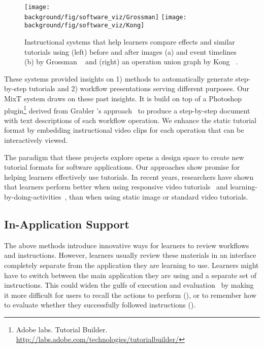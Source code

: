 \begin{figure*}[t!]
  \centering
  \texttt{[image: \\background/fig/software\_viz/Grossman]}
  \texttt{[image: \\background/fig/software\_viz/Kong]}
  \caption{Instructional systems that help learners compare effects and similar tutorials using (left) before and after images (a) and event timelines (b) by Grossman \ea{}~\cite{Grossman:2010jz} and (right) an operation union graph by Kong \ea{}~\cite{Kong:2012:DTR:2207676.2208549}.}
  \label{fig:related_comparison}
\end{figure*}

These systems provided insights on 1) methods to automatically generate step-by-step tutorials and 2) workflow presentations serving different purposes.
%
Our MixT system draws on these past insights. It is build on top of a Photoshop plugin\footnote{Adobe labs. Tutorial Builder. \url{http://labs.adobe.com/technologies/tutorialbuilder/}} derived from Grabler \ea{}'s approach~\cite{Grabler:2009jj} to produce a step-by-step document with text descriptions of each workflow operation. We enhance the static tutorial format by embedding instructional video clips for each operation that can be interactively viewed.

The paradigm that these projects explore opens a design space to create new tutorial formats for software applications. Our approaches show promise for helping learners effectively use tutorials. In recent years, researchers have shown that learners perform better when using responsive video tutorials~\cite{Nguyen:2015:MST:2702123.2702209} and learning-by-doing-activities~\cite{Kwon:2016:CEO:2858036.2858101}, than when using static image or standard video tutorials.


\subsection{In-Application Support}

The above methods introduce innovative ways for learners to review workflows and instructions. However, learners usually review these materials in an interface completely separate from the application they are learning to use. Learners might have to switch between the main application they are using and a separate set of instructions. This could widen the gulfs of execution and evaluation~\cite{Hutchins:1985:DMI:1453233.1453235} by making it more difficult for users to recall the actions to perform (), or to remember how to evaluate whether they successfully followed instructions ().

